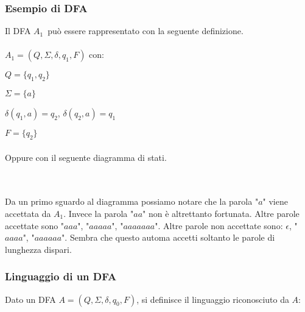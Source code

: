 \documentclass[]{article}
\begin{document}
\newpage
\subsubsection{Esempio di DFA}

Il DFA \mbox{$A_1$}\ può essere rappresentato con la seguente definizione.
\\
\\
\mbox{$A_1 = (Q, \Sigma, \delta, q_1, F)$} con:

\mbox{$Q = \{ q_1, q_2 \}$}

\mbox{$\Sigma = \{ a \}$}

\mbox{$\delta(q_1, a) = q_2$}, \mbox{$\delta(q_2, a) = q_1$}

\mbox{$F = \{ q_2 \}$}
\\
\\
Oppure con il seguente diagramma di stati.
\\
\\
\\
Da un primo sguardo al diagramma possiamo notare che la parola "\mbox{$a$}" viene accettata da \mbox{$A_1$}.
Invece la parola "\mbox{$aa$}" non è altrettanto fortunata. Altre parole accettate sono "\mbox{$aaa$}",
"\mbox{$aaaaa$}", "\mbox{$aaaaaaa$}".
Altre parole non accettate sono: \mbox{$\epsilon$}, "\mbox{$aaaa$}", "\mbox{$aaaaaa$}". Sembra che questo automa
accetti soltanto le parole di lunghezza dispari.



\subsubsection{Linguaggio di un DFA}
Dato un DFA \mbox{$A = (Q, \Sigma, \delta, q_0, F)$}, si definisce il linguaggio riconosciuto da \mbox{$A$}:
\\
\end{document}
